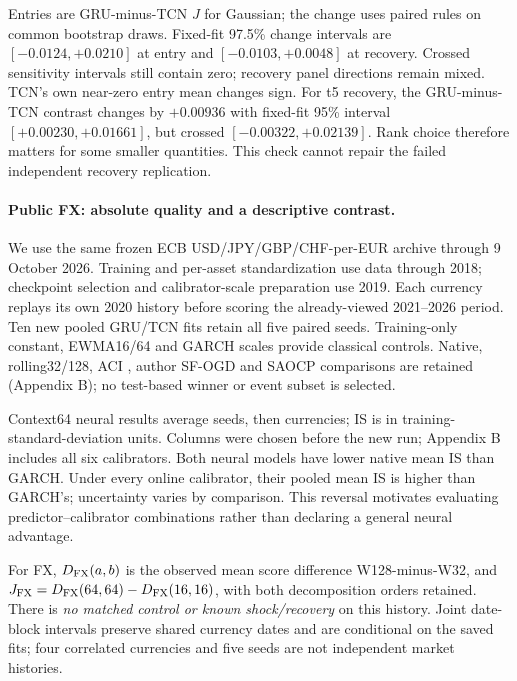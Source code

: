 \documentclass{article}
\begin{document}
\begin{center}
\RankReadout
\end{center}
\noindent Entries are GRU-minus-TCN $J$ for Gaussian; the change uses paired
rules on common bootstrap draws. Fixed-fit 97.5\% change intervals are
$[-0.0124,+0.0210]$ at entry and $[-0.0103,+0.0048]$ at recovery.
Crossed sensitivity intervals still contain zero; recovery panel directions
remain mixed. TCN's own near-zero entry mean changes sign. For t5 recovery,
the GRU-minus-TCN contrast changes by $+0.00936$ with fixed-fit 95\% interval
$[+0.00230,+0.01661]$, but crossed $[-0.00322,+0.02139]$.
Rank choice therefore matters for some smaller quantities. This check
cannot repair the failed independent recovery replication.

\paragraph{Public FX: absolute quality and a descriptive contrast.}
We use the same frozen ECB \citep{ecb} USD/JPY/GBP/CHF-per-EUR archive through
9 October 2026. Training and per-asset standardization use data through
2018; checkpoint selection and calibrator-scale preparation use 2019.
Each currency replays its own 2020 history before scoring the already-viewed
2021--2026 period. Ten new pooled GRU/TCN fits retain all five paired seeds.
Training-only constant, EWMA16/64 and GARCH scales provide classical controls.
Native, rolling32/128, ACI \citep{aci}, author SF-OGD and SAOCP comparisons are retained
(Appendix B); no test-based winner or event subset is selected.

\begin{center}
\FXMainReadout
\end{center}
\noindent Context64 neural results average seeds, then currencies; IS is
in training-standard-deviation units. Columns were chosen before the new
run; Appendix B includes all six calibrators. Both neural models have lower native mean IS than GARCH. Under every
online calibrator, their pooled mean IS is higher than GARCH's; uncertainty
varies by comparison. This reversal motivates evaluating predictor--calibrator
combinations rather than declaring a general neural advantage.

For FX, $D_{\rm FX}(a,b)$ is the observed mean score difference W128-minus-W32,
and $J_{\rm FX}=D_{\rm FX}(64,64)-D_{\rm FX}(16,16)$, with both decomposition
orders retained. There is \emph{no matched control or known shock/recovery}
on this history. Joint date-block intervals preserve shared currency dates
and are conditional on the saved fits; four correlated currencies and five
seeds are not independent market histories.
\end{document}
